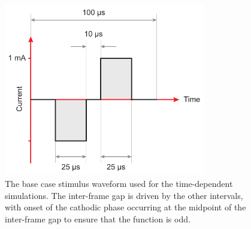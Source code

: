 \begin{figure}
	\centering
	\includegraphics[height=7.5cm]{Simulations/TimeDep/base_stimulus}
	\caption[The base case stimulus waveform]{The base case stimulus waveform used
	for the time-dependent simulations. The inter-frame gap is driven by the other
	intervals, with onset of the cathodic phase occurring at the midpoint of the
	inter-frame gap to ensure that the function is odd.}
	\label{fig:base_stimulus}
\end{figure}

